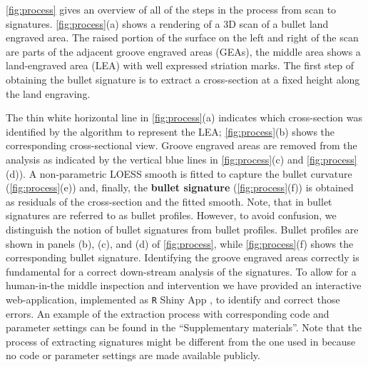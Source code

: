 \autoref{fig:process} gives an overview of all of the steps in the
process from scan to signatures. \autoref{fig:process}(a) shows a
rendering of a 3D scan of a bullet land engraved area. The raised
portion of the surface on the left and right of the scan are parts of
the adjacent groove engraved areas (GEAs), the middle area shows a
land-engraved area (LEA) with well expressed striation marks. The first
step of obtaining the bullet signature is to extract a cross-section at
a fixed height along the land engraving.

The thin white horizontal line in \autoref{fig:process}(a) indicates
which cross-section was identified by the algorithm to represent the
LEA; \autoref{fig:process}(b) shows the corresponding cross-sectional
view. Groove engraved areas are removed from the analysis as indicated
by the vertical blue lines in \autoref{fig:process}(c) and
\autoref{fig:process}(d)). A non-parametric LOESS smooth \citep{loess}
is fitted to capture the bullet curvature (\autoref{fig:process}(e))
and, finally, the \textbf{bullet signature} (\autoref{fig:process}(f))
is obtained as residuals of the cross-section and the fitted smooth.
Note, that in \citet{cmps} bullet signatures are referred to as bullet
profiles. However, to avoid confusion, we distinguish the notion of
bullet signatures from bullet profiles. Bullet profiles are shown in
panels (b), (c), and (d) of \autoref{fig:process}, while
\autoref{fig:process}(f) shows the corresponding bullet signature.
Identifying the groove engraved areas correctly is fundamental for a
correct down-stream analysis of the signatures. To allow for a
human-in-the middle inspection and intervention we have provided an
interactive web-application, implemented as \texttt{R} Shiny App
\citep{shiny},  to identify and correct those
errors. An example of the extraction process with corresponding code and
parameter settings can be found in the ``Supplementary materials''. Note
that the process of extracting signatures might be different from the
one used in \citet{cmps} because no code or parameter settings are made
available publicly.

